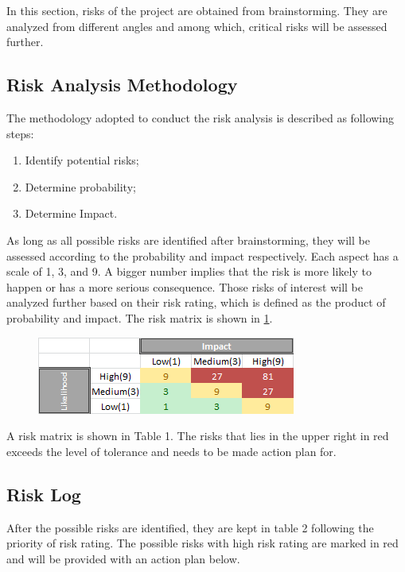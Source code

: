 

In this section, risks of the project are obtained from brainstorming. They are analyzed from different angles and among which, critical risks will be assessed further.   
\subsection{Risk Analysis Methodology}
The methodology adopted to conduct the risk analysis is described as following steps:  
\begin{enumerate}[itemsep=0pt, topsep=3pt, partopsep=3pt]
  \item Identify potential risks;
  \item Determine probability;
  \item Determine Impact.
\end{enumerate}

As long as all possible risks are identified after brainstorming, they will be assessed according to the probability and impact respectively. Each aspect has a scale of 1, 3, and 9. A bigger number implies that the risk is more likely to happen or has a more serious consequence. Those risks of interest will be analyzed further based on their risk rating, which is defined as the product of probability and impact. The risk matrix is shown in \ref{fig:riskmatrix}.  


\begin{figure}[h!]
\centering
\includegraphics[scale=1.0]{Pictures/riskmatrix.png}
\label{fig:riskmatrix}
\end{figure}

A risk matrix is shown in Table 1. The risks that lies in the upper right in red exceeds the level of tolerance and needs to be made action plan for. 
\subsection{Risk Log}
After the possible risks are identified, they are kept in table 2 following the priority of risk rating. The possible risks with high risk rating are marked in red and will be provided with an action plan below. 

